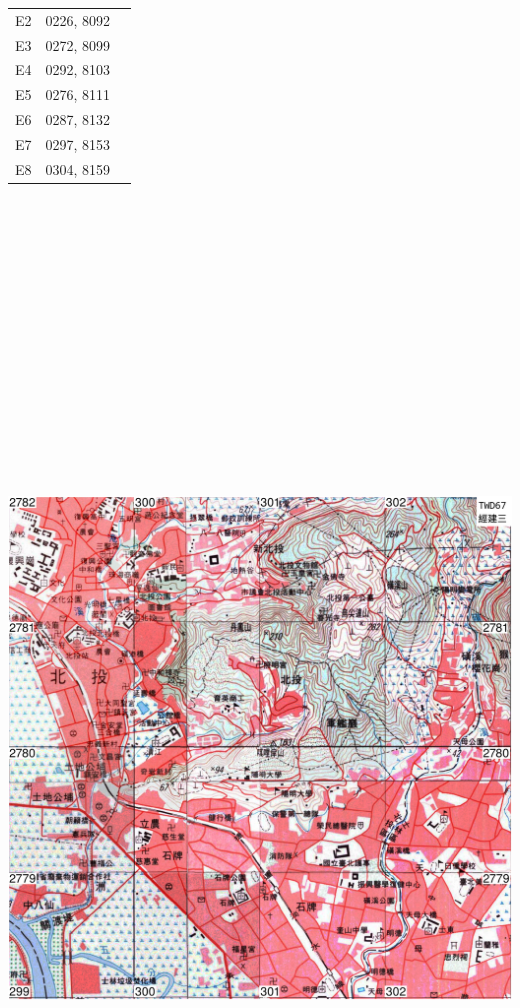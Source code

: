 \documentclass[12pt,landscape]{article}
\begin{document}
\begin{multicols}{2}
\begin{tabular}{|c|c|c|}
	E2 & 0226, 8092 & \\
	E3 & 0272, 8099 & \\
	E4 & 0292, 8103 & \\
	E5 & 0276, 8111 & \\
	E6 & 0287, 8132 & \\
	E7 & 0297, 8153 & \\
	E8 & 0304, 8159 & \\
	\hline
\end{tabular}
\newpage
\includegraphics[width=32cm, height=32cm]{v3.png}

\end{multicols}
\end{document}
